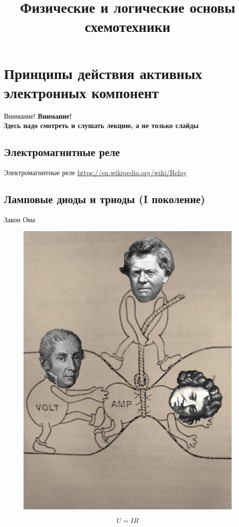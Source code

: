 \documentclass[xetex,aspectratio=43]{beamer}
\title[Основы схемотехники]{Физические и логические основы схемотехники}
\begin{document}
    \titleslide

    \tocslide


\section{Принципы действия активных электронных компонент}

\begin{frame}{Внимание!}
    \textbf{\alert{Внимание!\\
            Здесь надо смотреть и слушать лекцию, а не только слайды}}
\end{frame}

\subsection{Электромагнитные реле}

\begin{frame}{Электромагнитные реле}
    \url{https://en.wikipedia.org/wiki/Relay}
\end{frame}

\subsection{Ламповые диоды и триоды (I поколение)}

\begin{frame}{Закон Ома}
    \begin{figure}
        \includegraphics[height=0.75\textheight]{img/07.Ohm_Law.jpg}
    \end{figure}
    $$U = IR$$
\end{frame}
\end{document}
